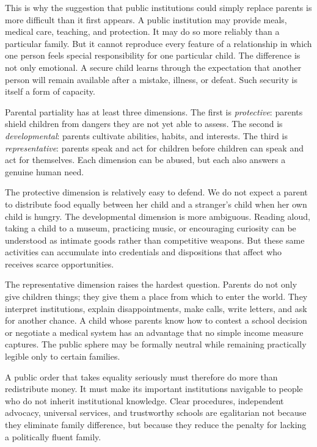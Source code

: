 ﻿\documentclass[12pt,a4paper]{book}
\begin{document}
This is why the suggestion that public institutions could simply replace
parents is more difficult than it first appears.  A public institution may
provide meals, medical care, teaching, and protection.  It may do so more
reliably than a particular family.  But it cannot reproduce every feature
of a relationship in which one person feels special responsibility for one
particular child.  The difference is not only emotional.  A secure child
learns through the expectation that another person will remain available
after a mistake, illness, or defeat.  Such security is itself a form of
capacity.

Parental partiality has at least three dimensions.  The first is
\emph{protective}: parents shield children from dangers they are not yet
able to assess.  The second is \emph{developmental}: parents cultivate
abilities, habits, and interests.  The third is \emph{representative}:
parents speak and act for children before children can speak and act for
themselves.  Each dimension can be abused, but each also answers a genuine
human need.

The protective dimension is relatively easy to defend.  We do not expect a
parent to distribute food equally between her child and a stranger's child
when her own child is hungry.  The developmental dimension is more
ambiguous.  Reading aloud, taking a child to a museum, practicing music,
or encouraging curiosity can be understood as intimate goods rather than
competitive weapons.  But these same activities can accumulate into
credentials and dispositions that affect who receives scarce opportunities.

The representative dimension raises the hardest question.  Parents do not
only give children things; they give them a place from which to enter the
world.  They interpret institutions, explain disappointments, make calls,
write letters, and ask for another chance.  A child whose parents know how
to contest a school decision or negotiate a medical system has an advantage
that no simple income measure captures.  The public sphere may be formally
neutral while remaining practically legible only to certain families.

A public order that takes equality seriously must therefore do more than
redistribute money.  It must make its important institutions navigable to
people who do not inherit institutional knowledge.  Clear procedures,
independent advocacy, universal services, and trustworthy schools are
egalitarian not because they eliminate family difference, but because they
reduce the penalty for lacking a politically fluent family.
\end{document}
